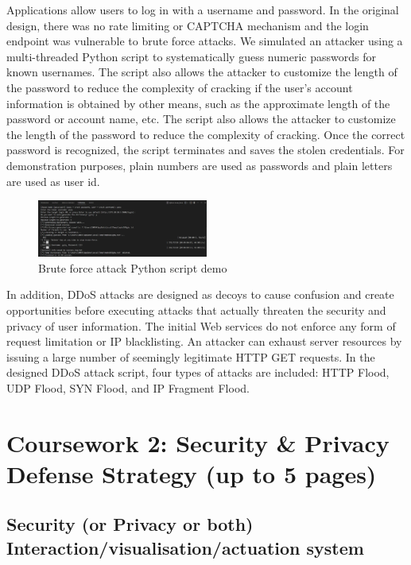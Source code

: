 \documentclass{article}
\begin{document}
Applications allow users to log in with a username and password. In the original design, there was no rate limiting or CAPTCHA mechanism and the login endpoint was vulnerable to brute force attacks. We simulated an attacker using a multi-threaded Python script to systematically guess numeric passwords for known usernames. The script also allows the attacker to customize the length of the password to reduce the complexity of cracking if the user's account information is obtained by other means, such as the approximate length of the password or account name, etc. The script also allows the attacker to customize the length of the password to reduce the complexity of cracking. Once the correct password is recognized, the script terminates and saves the stolen credentials. For demonstration purposes, plain numbers are used as passwords and plain letters are used as user id.

\begin{figure}[htb]
    \centering
    \includegraphics[width=0.5\textwidth]{images/Brute force attack Python script demo.png}
    \caption{Brute force attack Python script demo}
    \label{fig:brute_force_attack}
\end{figure}

In addition, DDoS attacks are designed as decoys to cause confusion and create opportunities before executing attacks that actually threaten the security and privacy of user information. The initial Web services do not enforce any form of request limitation or IP blacklisting. An attacker can exhaust server resources by issuing a large number of seemingly legitimate HTTP GET requests. In the designed DDoS attack script, four types of attacks are included: HTTP Flood, UDP Flood, SYN Flood, and IP Fragment Flood.







\section{Coursework 2: Security \& Privacy Defense Strategy (up to 5 pages)}
\subsection{Security (or Privacy or both) Interaction/visualisation/actuation system}
\end{document}
